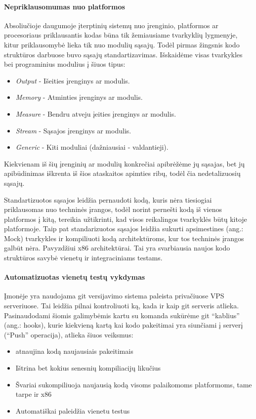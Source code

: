 \documentclass[12pt, a4paper, lithuanian, final]{article}
\begin{document}
\paragraph{Nepriklausomumas nuo platformos}

Absoliučioje daugumoje įterptinių sistemų nuo įrenginio, platformos ar procesoriaus priklausantis kodas būna tik žemiausiame tvarkyklių lygmenyje, kitur priklausomybė lieka tik nuo modulių sąsajų.
Todėl pirmas žingsnis kodo struktūros darbuose buvo sąsajų standartizavimas.
Išskaidėme visas tvarkykles bei programinius modulius į šiuos tipus:
\begin{itemize}
	\item \textit{Output} - Išeities įrenginys ar modulis.
	\item \textit{Memory} - Atminties įrenginys ar modulis.
	\item \textit{Measure} - Bendru atveju įeities įrenginys ar modulis.
	\item \textit{Stream} - Sąsajos įrenginys ar modulis.
	\item \textit{Generic} - Kiti moduliai (dažniausiai - valdantieji).
\end{itemize}

Kiekvienam iš šių įrenginių ar modulių konkrečiai apibrėžėme jų sąsajas, bet jų apibūdinimas iškrenta iš šios ataskaitos apimties ribų, todėl čia nedetalizuosių sąsajų.


Standartizuotos sąsajos leidžia pernaudoti kodą, kuris nėra tiesiogiai priklausomas nuo techninės įrangos, todėl norint pernešti kodą iš vienos platformos į kitą, tereikia užtikrinti, kad visos reikalingos tvarkyklės būtų kitoje platformoje.
Taip pat standarizuotos sąsajos leidžia sukurti apsimestines (ang.: Mock) tvarkykles ir kompiliuoti kodą architektūroms, kur tos techninės įrangos galbūt nėra. Pavyzdžiui x86 architektūrai.
Tai yra svarbiausia naujos kodo struktūros savybė vienetų ir integraciniams testams.


\paragraph{Automatizuotas vienetų testų vykdymas}

Įmonėje yra naudojama git versijavimo sistema paleista privačiuose VPS serveriuose.
Tai leidžia pilnai kontroliuoti ką, kada ir kaip git serveris atlieka.
Pasinaudodami šiomis galimybėmis kartu su komanda sukūrėme git "`kablius"' (ang.: hooks), kurie kiekvieną kartą kai kodo pakeitimai yra siunčiami į serverį ("`Push"' operacija), atlieka šiuos veiksmus:
\begin{itemize}
	\item atnaujina kodą naujausiais pakeitimais
	\item Ištrina bet kokius senesnių kompiliacijų likučius
	\item Švariai sukompiliuoja naujausią kodą visoms palaikomoms platformoms, tame tarpe ir x86
	\item Automatiškai paleidžia vienetu testus
\end{itemize}
\end{document}
